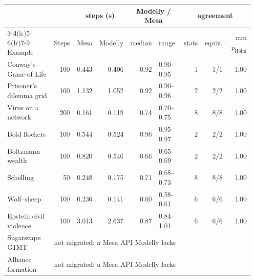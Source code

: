 \begin{tabular}{lrrrrlrrr}
\toprule
 & & \multicolumn{2}{c}{steps (s)} & \multicolumn{2}{c}{Modelly / Mesa} & \multicolumn{3}{c}{agreement} \\
\cmidrule(lr){3-4}\cmidrule(lr){5-6}\cmidrule(lr){7-9}
Example & Steps & Mesa & Modelly & median & range & stats & equiv. & min $p_{\mathrm{Holm}}$ \\
\midrule
Conway's Game of Life & 100 & 0.443 & 0.406 & 0.92 & 0.90--0.95 & 1 & 1/1 & 1.00 \\
Prisoner's dilemma grid & 100 & 1.132 & 1.052 & 0.92 & 0.90--0.96 & 2 & 2/2 & 1.00 \\
Virus on a network & 200 & 0.161 & 0.119 & 0.74 & 0.70--0.75 & 8 & 8/8 & 1.00 \\
Boid flockers & 100 & 0.544 & 0.524 & 0.96 & 0.95--0.97 & 2 & 2/2 & 1.00 \\
Boltzmann wealth & 100 & 0.820 & 0.546 & 0.66 & 0.65--0.69 & 2 & 2/2 & 1.00 \\
Schelling & 50 & 0.248 & 0.175 & 0.71 & 0.68--0.73 & 8 & 8/8 & 1.00 \\
Wolf--sheep & 100 & 0.236 & 0.141 & 0.60 & 0.58--0.61 & 6 & 6/6 & 1.00 \\
Epstein civil violence & 100 & 3.013 & 2.637 & 0.87 & 0.84--1.01 & 6 & 6/6 & 1.00 \\
Sugarscape G1MT & \multicolumn{8}{l}{not migrated: a Mesa API Modelly lacks} \\
Alliance formation & \multicolumn{8}{l}{not migrated: a Mesa API Modelly lacks} \\
\bottomrule
\end{tabular}
